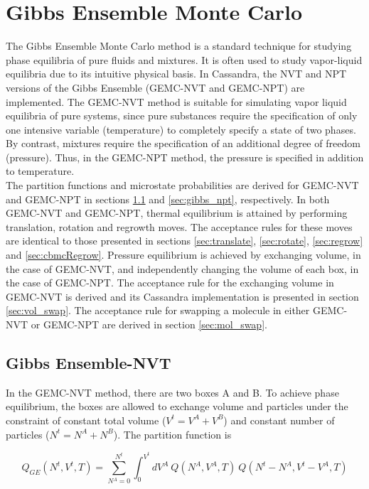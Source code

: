 \section{Gibbs Ensemble Monte Carlo} 
\label{sec:gibbs}

The Gibbs Ensemble Monte Carlo method is a standard technique for studying phase equilibria of pure fluids and mixtures. 
It is often used to study vapor-liquid equilibria due to its intuitive physical basis. 
In Cassandra, the NVT and NPT versions of the Gibbs Ensemble (GEMC-NVT and GEMC-NPT) are implemented. 
The GEMC-NVT method is suitable for simulating vapor liquid equilibria of pure systems, 
since pure substances require the specification of only one intensive variable 
(temperature) to completely specify a state of two phases. 
By contrast, mixtures require the specification of an additional degree of freedom (pressure).
Thus, in the GEMC-NPT method, the pressure is specified in addition to temperature. \\

The partition functions and microstate probabilities 
are derived for GEMC-NVT and GEMC-NPT 
in sections \ref{sec:gibbs_nvt} and \ref{sec:gibbs_npt}, 
respectively.
In both GEMC-NVT and GEMC-NPT, thermal equilibrium is attained by performing translation, rotation and regrowth moves. 
The acceptance rules for these moves are identical to those presented
in sections \ref{sec:translate}, \ref{sec:rotate}, \ref{sec:regrow} and \ref{sec:cbmcRegrow}.
Pressure equilibrium is achieved by exchanging volume, in the case of GEMC-NVT, and
independently changing the volume of each box, in the case of GEMC-NPT. 
The acceptance rule for the exchanging volume in GEMC-NVT is derived and 
its Cassandra implementation is presented in section \ref{sec:vol_swap}.
The acceptance rule for swapping a molecule in either GEMC-NVT or GEMC-NPT are derived 
in section \ref{sec:mol_swap}.

\subsection{Gibbs Ensemble-NVT}
\label{sec:gibbs_nvt}

In the GEMC-NVT method, there are two boxes A and B.
To achieve phase equilibrium, the boxes are allowed to exchange volume and particles under the 
constraint of constant total volume ($V^t=V^A + V^B$) and constant number of particles ($N^t=N^A + N^B$). 
The partition function is

\begin{equation}
Q_{GE}\left(N^t,V^t,T\right) = \sum^{N^t}_{N{^A}=0} \int^{V^t}_0 dV^A\ Q(N^A,V^A,T)\ Q(N^t-N^A,V^t-V^A,T)
\label{eq:partitionFn_GENVT}
\end{equation}

